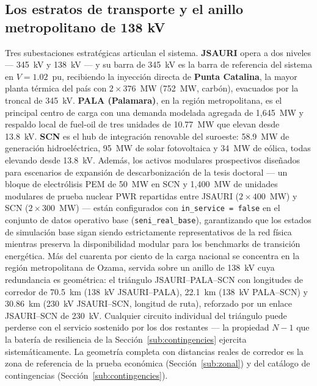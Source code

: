 \subsection{Los estratos de transporte y el anillo metropolitano de 138 kV}
\label{sub:strata}

Tres subestaciones estratégicas articulan el sistema. \textbf{JSAURI} opera a dos niveles --- 345~kV y 138~kV --- y su barra de 345~kV es la barra de referencia del sistema en $V = 1.02$~pu, recibiendo la inyección directa de \textbf{Punta Catalina}, la mayor planta térmica del país con $2 \times 376$~MW (752~MW, carbón), evacuados por la troncal de 345~kV. \textbf{PALA (Palamara)}, en la región metropolitana, es el principal centro de carga con una demanda modelada agregada de 1,645~MW y respaldo local de fuel-oil de tres unidades de 10.77~MW que elevan desde 13.8~kV. \textbf{SCN} es el hub de integración renovable del suroeste: 58.9~MW de generación hidroeléctrica, 95~MW de solar fotovoltaica y 34~MW de eólica, todas elevando desde 13.8~kV. Además, los activos modulares prospectivos diseñados para escenarios de expansión de descarbonización de la tesis doctoral --- un bloque de electrólisis PEM de 50~MW en SCN y 1,400~MW de unidades modulares de prueba nuclear PWR repartidas entre JSAURI ($2 \times 400$~MW) y SCN ($2 \times 300$~MW) --- están configurados con \texttt{in\_service = false} en el conjunto de datos operativo base (\texttt{seni\_real\_base}), garantizando que los estados de simulación base sigan siendo estrictamente representativos de la red física mientras preserva la disponibilidad modular para los benchmarks de transición energética. Más del cuarenta por ciento de la carga nacional se concentra en la región metropolitana de Ozama, servida sobre un anillo de 138~kV cuya redundancia es geométrica: el triángulo JSAURI--PALA--SCN con longitudes de corredor de 70.5~km (138~kV JSAURI--PALA), 22.1~km (138~kV PALA--SCN) y 30.86~km (230~kV JSAURI--SCN, longitud de ruta), reforzado por un enlace JSAURI--SCN de 230~kV. Cualquier circuito individual del triángulo puede perderse con el servicio sostenido por los dos restantes --- la propiedad $N-1$ que la batería de resiliencia de la Sección~\ref{sub:contingencies} ejercita sistemáticamente. La geometría completa con distancias reales de corredor es la zona de referencia de la prueba económica (Sección~\ref{sub:zonal}) y del catálogo de contingencias (Sección~\ref{sub:contingencies}).

